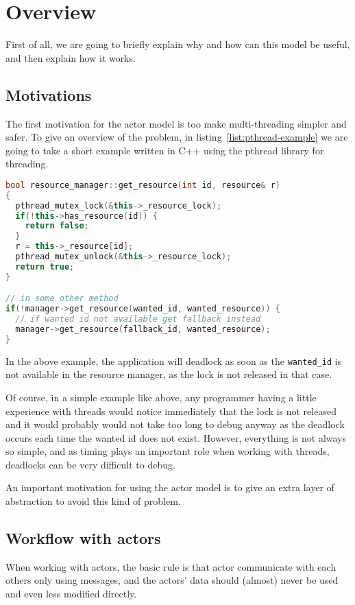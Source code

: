 \section{Overview}
%
First of all, we are going to briefly explain why and how can this model be useful, 
and then explain how it works.
%
\subsection{Motivations}
%
The first motivation for the actor model is too make multi-threading simpler and safer.
To give an overview of the problem, in listing~\ref{list:pthread-example}
we are going to take a short example written in C++ using the pthread library for threading.
%
\begin{lstlisting}[basicstyle=\footnotesize,caption=Threading example in C++,language=C++,label=list:pthread-example]
bool resource_manager::get_resource(int id, resource& r)
{
  pthread_mutex_lock(&this->_resource_lock);
  if(!this->has_resource(id)) {
    return false;
  }
  r = this->_resource[id];
  pthread_mutex_unlock(&this->_resource_lock);
  return true;
}

// in some other method
if(!manager->get_resource(wanted_id, wanted_resource)) {
  // if wanted id not available get fallback instead
  manager->get_resource(fallback_id, wanted_resource);
}
\end{lstlisting}
In the above example, the application will deadlock as soon as the \lstinline{wanted_id}
is not available in the resource manager, as the lock is not released in that case.

Of course, in a simple example like above, any programmer having a little experience 
with threads would notice immediately that the lock is not released and it would 
probably would not take too long to debug anyway as the deadlock occurs each time the 
wanted id does not exist. 
However, everything is not always so simple, and as timing plays an important 
role when working with threads, deadlocks can be very difficult to debug.

An important motivation for using the actor model is to give an extra layer of 
abstraction to avoid this kind of problem.
%
\subsection{Workflow with actors}
When working with actors, the basic rule is that actor communicate 
with each others only using messages, and the actors' data should (almost) never be 
used and even less modified directly.

